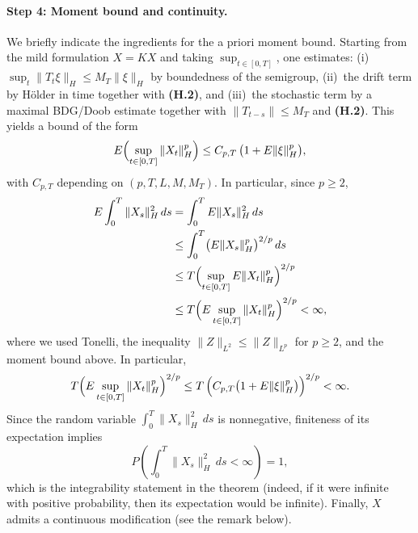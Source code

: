 \documentclass[11pt]{article}
\theoremstyle{definition}
\theoremstyle{remark}
\begin{document}
\paragraph{Step 4: Moment bound and continuity.}
We briefly indicate the ingredients for the a priori moment bound.  Starting from the mild
formulation $X=KX$ and taking $\sup_{t\in[0,T]}$, one estimates:
(i)\ $\sup_t\|T_t\xi\|_H\le M_T\|\xi\|_H$ by boundedness of the semigroup,
(ii)\ the drift term by H\"older in time together with \textbf{(H.2)}, and
(iii)\ the stochastic term by a maximal BDG/Doob estimate together with $\|T_{t-s}\|\le M_T$
and \textbf{(H.2)}.  This yields a bound of the form
\[
    E\Bigl(\sup_{t\in[0,T]}\|X_t\|_H^p\Bigr)
    \le
    C_{p,T}\,\bigl(1+E\|\xi\|_H^p\bigr),
\]
with $C_{p,T}$ depending on $(p,T,L,M,M_T)$.
In particular, since $p\ge 2$,
\begin{align*}
    E\int_0^T \|X_s\|_H^2\,ds
    &=
    \int_0^T E\|X_s\|_H^2\,ds
    \\
    &\le
    \int_0^T \bigl(E\|X_s\|_H^p\bigr)^{2/p}\,ds
    \\
    &\le
    T\Bigl(\sup_{t\in[0,T]}E\|X_t\|_H^p\Bigr)^{2/p}
    \\
    &\le
    T\Bigl(E\sup_{t\in[0,T]}\|X_t\|_H^p\Bigr)^{2/p}
    <\infty,
\end{align*}
where we used Tonelli, the inequality $\|Z\|_{L^2}\le \|Z\|_{L^p}$ for $p\ge 2$, and the moment bound above.
In particular,
\[
    T\Bigl(E\sup_{t\in[0,T]}\|X_t\|_H^p\Bigr)^{2/p}
    \le
    T\,\Bigl(C_{p,T}\bigl(1+E\|\xi\|_H^p\bigr)\Bigr)^{2/p}
    <\infty.
\]
Since the random variable $\int_0^T \|X_s\|_H^2\,ds$ is nonnegative, finiteness of its expectation implies
\[
    P\!\left(\int_0^T \|X_s\|_H^2\,ds < \infty\right)=1,
\]
which is the integrability statement in the theorem (indeed, if it were infinite with positive probability,
then its expectation would be infinite).
Finally, $X$ admits a continuous modification (see the remark below).
\end{document}

